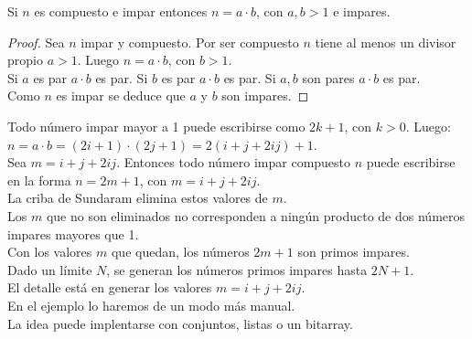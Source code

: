 \begin{enunciado}\label{enun:multiploimpar}\leavevmode\par
Si $n$ es compuesto e impar entonces $n= a \cdot b$, con $a,b > 1$ e impares.
\end{enunciado}

\begin{proof}
Sea $n$ impar y compuesto.
Por ser compuesto $n$ tiene al menos un divisor propio $a>1$. Luego $n = a \cdot b$, con $b > 1$. \\
Si $a$ es par $a \cdot b$ es par.
Si $b$ es par $a \cdot b$ es par.
Si $a,b$ son pares $a \cdot b$ es par.\\
Como $n$ es impar se deduce que $a$ y $b$ son impares.
\end{proof}

Todo número impar mayor a 1 puede escribirse como $2k+1$, con $k>0$. Luego: \\
$n = a \cdot b = (2i+1)\cdot(2j+1) = 2(i+j+2ij)+1$.\\
Sea $m = i+j+2ij$. Entonces todo número impar compuesto $n$ puede escribirse en la forma $n = 2m+1$, con $m = i+j+2ij$. \\
La criba de Sundaram elimina estos valores de $m$.\\
Los $m$ que no son eliminados no corresponden a ningún producto de dos números impares mayores que 1. \\
Con los valores $m$ que quedan, los números $2m+1$ son primos impares.\\
Dado un límite $N$, se generan los números primos impares hasta $2N+1$.\\
El detalle está en generar los valores $m = i+j+2ij$. \\
En el ejemplo lo haremos de un modo más manual.\\
La idea puede implentarse con conjuntos, listas o un bitarray.

